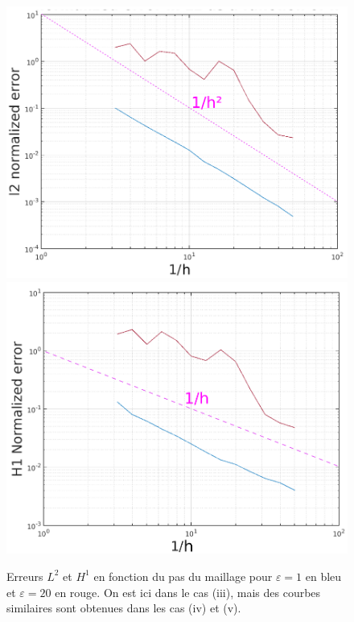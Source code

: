 \documentclass[11pt]{article}
\begin{document}
\begin{figure}
  \centering
  \includegraphics[height=.25\textheight]{SolutionExacte/err_L2} 
  \includegraphics[height=.25\textheight]{SolutionExacte/err_H1} 
  \caption{Erreurs $L^2$ et $H^1$ en fonction du pas du maillage pour $\varepsilon=1$ en bleu et  $\varepsilon=20$ en rouge. On est ici dans le cas
    (iii), mais des courbes similaires sont obtenues dans les cas (iv) et (v). }
  \label{fig:err_msh}
\end{figure}
\end{document}
